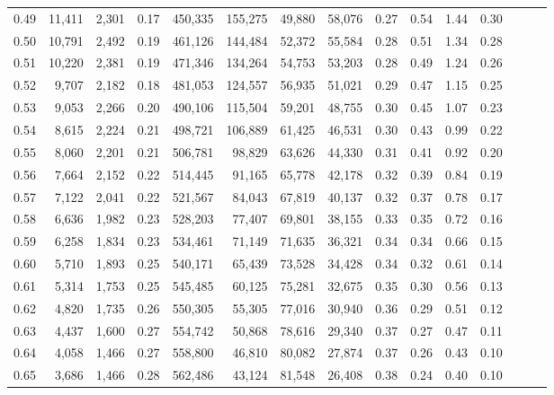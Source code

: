 \begin{tabular}{rrrrrrrrrrrrrrr}
0.49 &  11,411 &  2,301 &  0.17 &  450,335 &  155,275 &   49,880 &   58,076 &  0.27 &  0.54 &  1.44 &      0.30 \\
0.50 &  10,791 &  2,492 &  0.19 &  461,126 &  144,484 &   52,372 &   55,584 &  0.28 &  0.51 &  1.34 &      0.28 \\
0.51 &  10,220 &  2,381 &  0.19 &  471,346 &  134,264 &   54,753 &   53,203 &  0.28 &  0.49 &  1.24 &      0.26 \\
0.52 &   9,707 &  2,182 &  0.18 &  481,053 &  124,557 &   56,935 &   51,021 &  0.29 &  0.47 &  1.15 &      0.25 \\
0.53 &   9,053 &  2,266 &  0.20 &  490,106 &  115,504 &   59,201 &   48,755 &  0.30 &  0.45 &  1.07 &      0.23 \\
0.54 &   8,615 &  2,224 &  0.21 &  498,721 &  106,889 &   61,425 &   46,531 &  0.30 &  0.43 &  0.99 &      0.22 \\
0.55 &   8,060 &  2,201 &  0.21 &  506,781 &   98,829 &   63,626 &   44,330 &  0.31 &  0.41 &  0.92 &      0.20 \\
0.56 &   7,664 &  2,152 &  0.22 &  514,445 &   91,165 &   65,778 &   42,178 &  0.32 &  0.39 &  0.84 &      0.19 \\
0.57 &   7,122 &  2,041 &  0.22 &  521,567 &   84,043 &   67,819 &   40,137 &  0.32 &  0.37 &  0.78 &      0.17 \\
0.58 &   6,636 &  1,982 &  0.23 &  528,203 &   77,407 &   69,801 &   38,155 &  0.33 &  0.35 &  0.72 &      0.16 \\
0.59 &   6,258 &  1,834 &  0.23 &  534,461 &   71,149 &   71,635 &   36,321 &  0.34 &  0.34 &  0.66 &      0.15 \\
0.60 &   5,710 &  1,893 &  0.25 &  540,171 &   65,439 &   73,528 &   34,428 &  0.34 &  0.32 &  0.61 &      0.14 \\
0.61 &   5,314 &  1,753 &  0.25 &  545,485 &   60,125 &   75,281 &   32,675 &  0.35 &  0.30 &  0.56 &      0.13 \\
0.62 &   4,820 &  1,735 &  0.26 &  550,305 &   55,305 &   77,016 &   30,940 &  0.36 &  0.29 &  0.51 &      0.12 \\
0.63 &   4,437 &  1,600 &  0.27 &  554,742 &   50,868 &   78,616 &   29,340 &  0.37 &  0.27 &  0.47 &      0.11 \\
0.64 &   4,058 &  1,466 &  0.27 &  558,800 &   46,810 &   80,082 &   27,874 &  0.37 &  0.26 &  0.43 &      0.10 \\
0.65 &   3,686 &  1,466 &  0.28 &  562,486 &   43,124 &   81,548 &   26,408 &  0.38 &  0.24 &  0.40 &      0.10 \\

\end{tabular}
